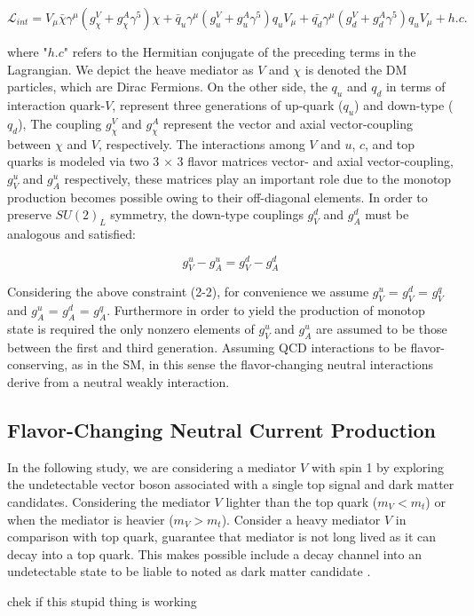 \begin{equation}
\mathcal{L}_{int} = V_{\mu }\bar{\chi}\gamma^{\mu}(g^{V}_{\chi}+g^{A}_{\chi}\gamma ^{5})\chi + \bar{q}_{u}\gamma^{\mu}(g^{V}_{u}+g^{A}_{u}\gamma^{5})q_{u}V_{\mu}+\bar{q_{d}}\gamma^{\mu}(g^{V}_{d}+g^{A}_{d}\gamma ^{5})q_{u}V_{\mu} + h.c.
\end{equation}

where "$h.c$"  refers to the Hermitian conjugate of the preceding terms in the Lagrangian. We depict the heave mediator as $V$ and $\chi$ is denoted the DM particles, which are Dirac Fermions. On the other side, the $q_{u}$ and $q_{d}$ in terms of interaction quark-$V$, represent three generations of up-quark ($q_{u}$) and down-type ($q_{d}$),  The coupling $g_{\chi}^{V}$ and $g_{\chi}^{A}$ represent the vector and axial vector-coupling between $\chi$ and $V$, respectively. The interactions among $V$ and $u$, $c$, and top quarks is modeled via two 3 $\times$ 3 flavor matrices vector- and axial vector-coupling, $g_{V}^{u}$ and $g_{A}^{u}$ respectively, these matrices play an important role due to the monotop production becomes possible owing to their off-diagonal elements. In order to preserve $SU(2)_{L}$ symmetry, the down-type couplings $g_{V}^{d}$ and $g_{A}^{d}$ must be analogous and satisfied:

\begin{equation}
g_{V}^{u}-g_{A}^{u} = g_{V}^{d} - g_{A}^{d}
\end{equation}

Considering the above constraint (2-2), for convenience we assume $g_{V}^{u}$ = $g_{V}^{d}$ =  $g_{V}^{q}$ and $g_{A}^{u}$ = $g_{A}^{d}$ =  $g_{A}^{q}$. Furthermore in order to yield the production of monotop state is required the only nonzero elements of $g_{V}^{u}$ and $g_{A}^{u}$ are assumed to be those between the first and third generation. Assuming QCD interactions to be flavor-conserving, as in the SM, in this sense the flavor-changing neutral interactions derive from a neutral weakly interaction.  

\subsection{Flavor-Changing Neutral Current Production}
In the following study, we are considering a mediator $V$ with spin 1 by exploring the undetectable vector boson associated with a single top signal and dark matter candidates. Considering the mediator $V$ lighter than the top quark ($m_{V} < m_{t}$) or when the mediator is heavier ($m_{V} > m_{t}$). Consider a heavy mediator $V$ in comparison with top quark, guarantee that mediator is not long lived as it can decay into a top quark. This makes possible include a decay channel into an undetectable state to be liable to noted as dark matter candidate \cite{324}.

chek if this stupid thing is working

\clearpage
